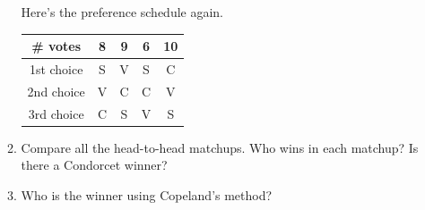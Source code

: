 \documentclass[12pt]{article}
\begin{document}
\begin{enumerate}
\begin{enumerate}
\newpage  

Here's the preference schedule again.

\begingroup %
\renewcommand{\arraystretch}{2} %
    \begin{tabular}{| c  | c | c  | c  | c |} \hline
    \# votes & 8&9&6&10\\ \hline \hline
1st choice & S& V& S & C\\ \hline
2nd choice &  V &C &  C&V\\ \hline
3rd choice & C & S& V  & S\\ \hline
\end{tabular}
\endgroup 

\item Compare all the head-to-head matchups. Who wins in each matchup? Is there a Condorcet winner?

\vfill

\item Who is the winner using Copeland's method?

\vfill


\end{enumerate}
\end{enumerate}
\end{document}
